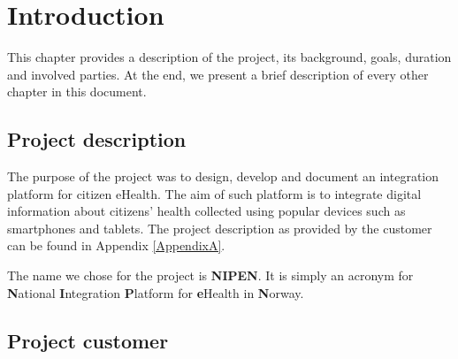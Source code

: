 
\chapter{Introduction} 
\label{Introduction} 


This chapter provides a description of the project, its background, goals, duration and involved parties.
At the end, we present a brief description of every other chapter in this document.

\section{Project description}
\label{section:description}

The purpose of the project was to design, develop and document an integration platform for citizen eHealth\cite{ehealth}. 
The aim of such platform is to integrate digital information about citizens' health \iffalse which is\fi collected using popular
devices such as smartphones and tablets.
The project description as provided by the customer can be found in Appendix \ref{AppendixA}.



The name we chose for the project is \textbf{NIPEN}.\newline
It is simply an acronym for \textbf{N}ational \textbf{I}ntegration \textbf{P}latform for \textbf{e}Health
in \textbf{N}orway.

\section{Project customer}
\label{section:client}

